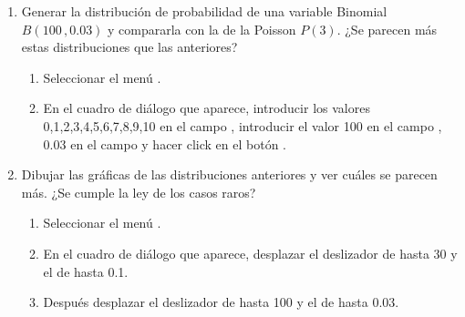 \begin{enumerate}[leftmargin=*]
\begin{enumerate}
\item Generar la distribución de probabilidad de una variable Binomial $B(100\,,0.03)$ y compararla con la de la
Poisson $P(3)$. ¿Se parecen más estas distribuciones que las anteriores? 
\begin{indicacion}{
\begin{enumerate}
\item Seleccionar el menú .
\item En el cuadro de diálogo que aparece, introducir los valores 0,1,2,3,4,5,6,7,8,9,10 en el campo , introducir el valor 100 en el campo , $0.03$ en
el campo  y hacer click en el botón .
\end{enumerate}}
\end{indicacion}

\item Dibujar las gráficas de las distribuciones anteriores y ver cuáles se parecen más. 
¿Se cumple la ley de los casos raros?
\begin{indicacion}{
\begin{enumerate}
\item Seleccionar el menú .
\item En el cuadro de diálogo que aparece, desplazar el deslizador de  hasta 30 y el de  hasta 0.1.
\item Después desplazar el deslizador de  hasta 100 y el de  hasta 0.03.
\end{enumerate}}
\end{indicacion}
\end{enumerate}
\end{enumerate}


